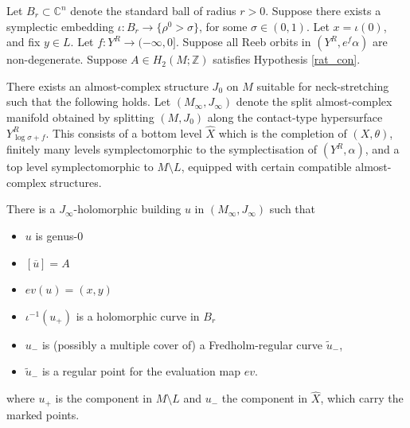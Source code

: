 \documentclass{article}
\numberwithin{equation}{section}
\numberwithin{figure}{section}
\begin{document}
\begin{lem}
\label{neck_stretch}
Let $B_r\subset \mathbb{C}^n$ denote the standard ball of radius $r>0$. Suppose there exists a symplectic embedding $\iota:B_r\rightarrow \{\rho^0>\sigma\}$, for some $\sigma\in (0,1)$. Let $x=\iota(0)$, and fix $y\in L$. Let $f:Y^R\rightarrow (-\infty,0]$. Suppose all Reeb orbits in $(Y^R,e^f\alpha)$ are non-degenerate. Suppose $A\in H_2(M;\mathbb{Z})$ satisfies Hypothesis \ref{rat_con}.

There exists an almost-complex structure $J_0$ on $M$ suitable for neck-stretching such that the following holds. Let $(M_\infty,J_\infty)$ denote the split almost-complex manifold obtained by splitting $(M,J_0)$ along the contact-type hypersurface $Y_{\log\sigma+f}^R$. This consists of a bottom level $\hat{X}$ which is the completion of $(X,\theta)$, finitely many levels symplectomorphic to the symplectisation of $(Y^R,\alpha)$, and a top level symplectomorphic to $M\setminus L$, equipped with certain compatible almost-complex structures.

There is a $J_\infty$-holomorphic building $u$ in $(M_\infty,J_\infty)$ such that
\begin{itemize}
    \item $u$ is genus-$0$
    \item $[\overline{u}]=A$
    \item $ev(u)=(x,y)$
    \item $\iota^{-1}(u_+)$ is a holomorphic curve in $B_r$
    \item $u_-$ is (possibly a multiple cover of) a Fredholm-regular curve $\tilde{u}_-$,
    \item $\tilde{u}_-$ is a regular point for the evaluation map $ev$.
\end{itemize}
where $u_+$ is the component in $M\setminus L$ and $u_-$ the component in $\hat{X}$, which carry the marked points.
\end{lem}
\end{document}

